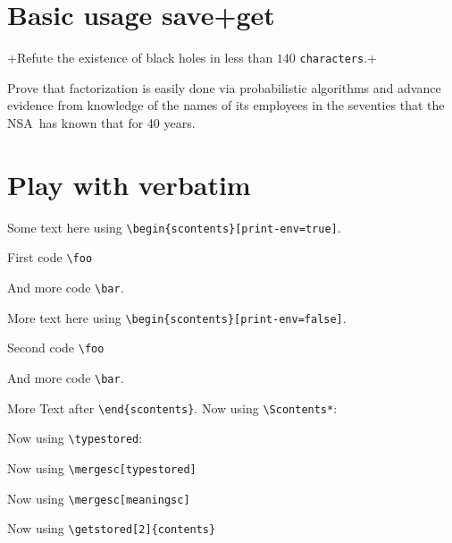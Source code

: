 \documentclass{article}
\begin{document}
\section{Basic usage save+get}
{}
\Scontents*[store-cmd=defexercise]+Refute the existence of black holes in less than $140$ \verb|characters|.+

\begin{scontents}[store-env=defexercise,write-env=\jobname.txt]
\def\NSA{NSA}%
Prove that factorization is easily done via probabilistic algorithms and
advance evidence from knowledge of the names of its employees in the
seventies that the \NSA\ has known that for 40 years.\par
\end{scontents}

\begin{itemize}
\end{itemize}

{}

\section{Play with verbatim}

Some text here using \verb|\begin{scontents}[print-env=true]|.

\begin{scontents}[print-env=true]
First code \verb|\foo|

And more code \verb|\bar|.
\end{scontents}

More text here using \verb|\begin{scontents}[print-env=false]|.
\begin{scontents}[print-env=false]
    Second code \verb|\foo|

And more code \verb|\bar|.
\end{scontents}

More Text after \verb|\end{scontents}|. Now using \verb|\Scontents*|:


Now using \verb|\typestored|:

Now using  \verb|\mergesc[typestored]|


Now using  \verb|\mergesc[meaningsc]|


Now using  \verb|\getstored[2]{contents}|

\end{document}
